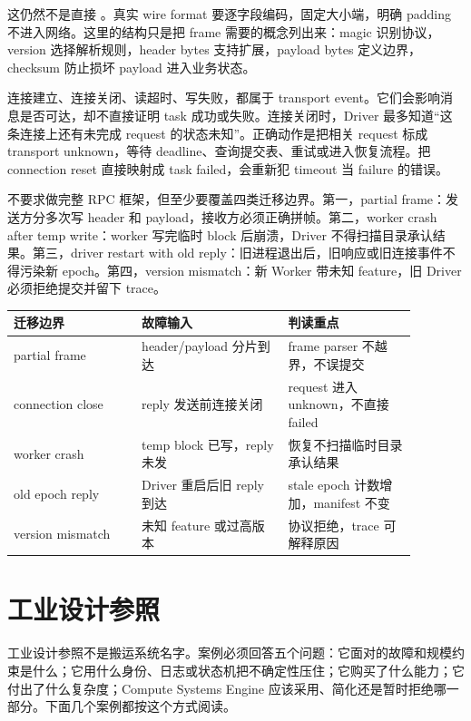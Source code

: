 这仍然不是直接 。真实 wire format 要逐字段编码，固定大小端，明确 padding 不进入网络。这里的结构只是把 frame 需要的概念列出来：magic 识别协议，version 选择解析规则，header bytes 支持扩展，payload bytes 定义边界，checksum 防止损坏 payload 进入业务状态。

连接建立、连接关闭、读超时、写失败，都属于 transport event。它们会影响消息是否可达，却不直接证明 task 成功或失败。连接关闭时，Driver 最多知道“这条连接上还有未完成 request 的状态未知”。正确动作是把相关 request 标成 transport unknown，等待 deadline、查询提交表、重试或进入恢复流程。把 connection reset 直接映射成 task failed，会重新犯 timeout 当 failure 的错误。

不要求做完整 RPC 框架，但至少要覆盖四类迁移边界。第一，partial frame：发送方分多次写 header 和 payload，接收方必须正确拼帧。第二，worker crash after temp write：worker 写完临时 block 后崩溃，Driver 不得扫描目录承认结果。第三，driver restart with old reply：旧进程退出后，旧响应或旧连接事件不得污染新 epoch。第四，version mismatch：新 Worker 带未知 feature，旧 Driver 必须拒绝提交并留下 trace。

\begin{center}
\begin{tabular}{p{0.28\linewidth}p{0.32\linewidth}p{0.28\linewidth}}
\toprule
迁移边界 & 故障输入 & 判读重点 \\
\midrule
partial frame & header/payload 分片到达 & frame parser 不越界，不误提交 \\
connection close & reply 发送前连接关闭 & request 进入 unknown，不直接 failed \\
worker crash & temp block 已写，reply 未发 & 恢复不扫描临时目录承认结果 \\
old epoch reply & Driver 重启后旧 reply 到达 & stale epoch 计数增加，manifest 不变 \\
version mismatch & 未知 feature 或过高版本 & 协议拒绝，trace 可解释原因 \\
\bottomrule
\end{tabular}
\end{center}

\section{工业设计参照}

工业设计参照不是搬运系统名字。案例必须回答五个问题：它面对的故障和规模约束是什么；它用什么身份、日志或状态机把不确定性压住；它购买了什么能力；它付出了什么复杂度；Compute Systems Engine 应该采用、简化还是暂时拒绝哪一部分。下面几个案例都按这个方式阅读。

